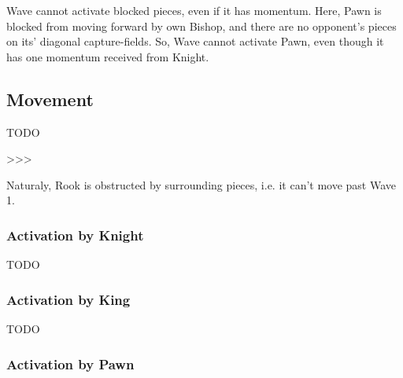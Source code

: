 Wave cannot activate blocked pieces, even if it has momentum. Here, Pawn is blocked
from moving forward by own Bishop, and there are no opponent's pieces on its'
diagonal capture-fields. So, Wave cannot activate Pawn, even though it has one
momentum received from Knight.

\clearpage %

\subsection*{Movement}


\huge
TODO
\normalsize

\textgreater \textgreater \textgreater

Naturaly, Rook is obstructed by surrounding pieces, i.e. it can't move past Wave 1.

\clearpage %

\subsubsection*{Activation by Knight}

\huge
TODO
\normalsize

\clearpage %

\subsubsection*{Activation by King}

\huge
TODO
\normalsize

\clearpage %

\subsubsection*{Activation by Pawn}

